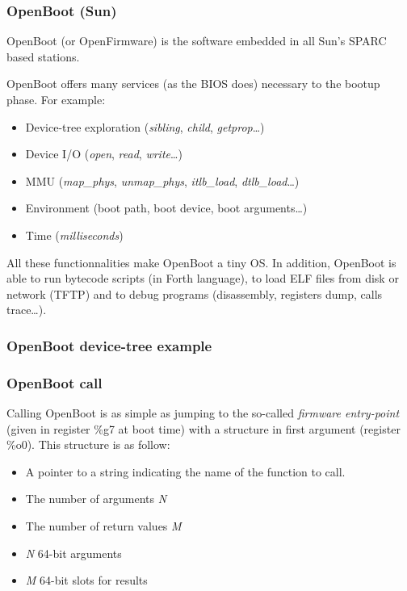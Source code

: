 \begin{frame}
  \frametitle{OpenBoot (Sun)}

  OpenBoot (or OpenFirmware) is the software embedded in all Sun's
  SPARC based stations.

  \-

  OpenBoot offers many services (as the BIOS does) necessary to the
  bootup phase. For example:

  \begin{itemize}
  \item
    Device-tree exploration (\emph{sibling}, \emph{child},
    \emph{getprop}\ldots)
  \item
    Device I/O (\emph{open}, \emph{read}, \emph{write}\ldots)
  \item
    MMU (\emph{map\_phys}, \emph{unmap\_phys}, \emph{itlb\_load},
    \emph{dtlb\_load}\ldots)
  \item
    Environment (boot path, boot device, boot arguments\ldots)
  \item
    Time (\emph{milliseconds})
  \end{itemize}

  \-

  All these functionnalities make OpenBoot a tiny OS. In addition,
  OpenBoot is able to run bytecode scripts (in Forth language), to
  load ELF files from disk or network (TFTP) and to debug programs
  (disassembly, registers dump, calls trace\ldots).

\end{frame}


\begin{frame}
  \frametitle{OpenBoot device-tree example}

  \begin{center}
  \end{center}

\end{frame}


\begin{frame}
  \frametitle{OpenBoot call}

  Calling OpenBoot is as simple as jumping to the so-called
  \emph{firmware entry-point} (given in register \%g7 at boot time)
  with a structure in first argument (register \%o0). This structure is
  as follow:

  \begin{itemize}
  \item
    A pointer to a string indicating the name of the function to call.
  \item
    The number of arguments \emph{N}
  \item
    The number of return values \emph{M}
  \item
    \emph{N} 64-bit arguments
  \item
    \emph{M} 64-bit slots for results
  \end{itemize}

\end{frame}

